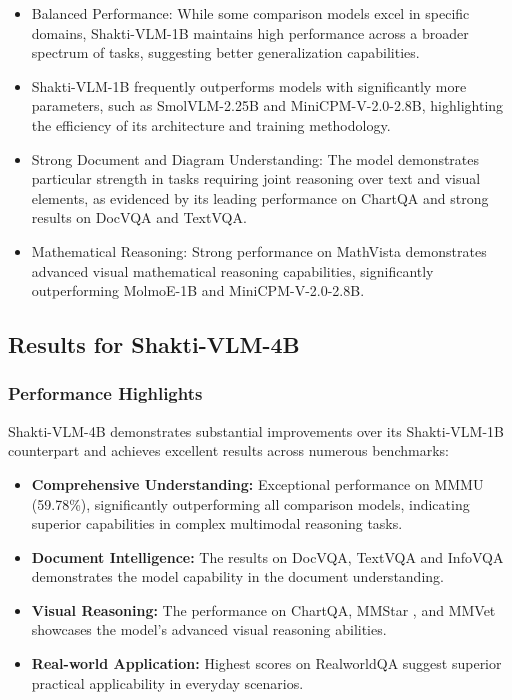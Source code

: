 \documentclass{article}
\begin{document}
\begin{itemize}
    \item Balanced Performance: While some comparison models excel in specific domains, Shakti-VLM-1B maintains high performance across a broader spectrum of tasks, suggesting better generalization capabilities. 

    \item Shakti-VLM-1B frequently outperforms models with significantly more parameters, such as SmolVLM-2.25B\cite{smolvlm} and MiniCPM-V-2.0-2.8B\cite{yao2024minicpm26}, highlighting the efficiency of its architecture and training methodology. 

    \item Strong Document and Diagram Understanding: The model demonstrates particular strength in tasks requiring joint reasoning over text and visual elements, as evidenced by its leading performance on ChartQA and strong results on DocVQA and TextVQA. 

    \item Mathematical Reasoning: Strong performance on MathVista demonstrates advanced visual mathematical reasoning capabilities, significantly outperforming MolmoE-1B\cite{deitke2024molmopixmoopenweights}  and MiniCPM-V-2.0-2.8B\cite{yao2024minicpm26}. 
\end{itemize}

\subsection{Results for Shakti-VLM-4B}
\subsubsection{Performance Highlights}

Shakti-VLM-4B demonstrates substantial improvements over its Shakti-VLM-1B counterpart and achieves excellent results across numerous benchmarks: 

\begin{itemize}
    \item \textbf{Comprehensive Understanding:} Exceptional performance on MMMU (59.78\%), significantly outperforming all comparison models, indicating superior capabilities in complex multimodal reasoning tasks.

    \item \textbf{Document Intelligence:} The results on DocVQA, TextVQA and InfoVQA demonstrates the model capability in the document understanding.

    \item \textbf{Visual Reasoning:} The performance on ChartQA, MMStar , and MMVet  showcases the model's advanced visual reasoning abilities.

    \item \textbf{Real-world Application: } Highest scores on RealworldQA suggest superior practical applicability in everyday scenarios.
\end{itemize}
\end{document}
